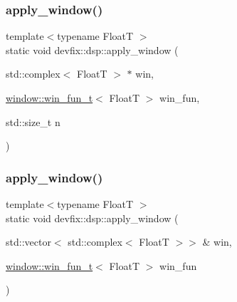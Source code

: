 \subsubsection{\texorpdfstring{apply\+\_\+window()}{apply\_window()}\hspace{0.1cm}{\footnotesize\ttfamily [4/6]}}
{\footnotesize\ttfamily template$<$typename FloatT $>$ \\
static void devfix\+::dsp\+::apply\+\_\+window (\begin{DoxyParamCaption}\item[{std\+::complex$<$ FloatT $>$ $\ast$}]{win,  }\item[{\hyperlink{structdevfix_1_1dsp_1_1window_ab2d2c0c5f5fca6dbcf91895115b69eac}{window\+::win\+\_\+fun\+\_\+t}$<$ FloatT $>$}]{win\+\_\+fun,  }\item[{std\+::size\+\_\+t}]{n }\end{DoxyParamCaption})\hspace{0.3cm}{\ttfamily [static]}}

\mbox{\label{namespacedevfix_1_1dsp_a7f5d2ade6feeeba107861b7040ee89b6}} 
\subsubsection{\texorpdfstring{apply\+\_\+window()}{apply\_window()}\hspace{0.1cm}{\footnotesize\ttfamily [5/6]}}
{\footnotesize\ttfamily template$<$typename FloatT $>$ \\
static void devfix\+::dsp\+::apply\+\_\+window (\begin{DoxyParamCaption}\item[{std\+::vector$<$ std\+::complex$<$ FloatT $>$$>$ \&}]{win,  }\item[{\hyperlink{structdevfix_1_1dsp_1_1window_ab2d2c0c5f5fca6dbcf91895115b69eac}{window\+::win\+\_\+fun\+\_\+t}$<$ FloatT $>$}]{win\+\_\+fun }\end{DoxyParamCaption})\hspace{0.3cm}{\ttfamily [static]}}

\mbox{\label{namespacedevfix_1_1dsp_aa05b8f98b6ec005c5c7e08efa0afb08a}} 
